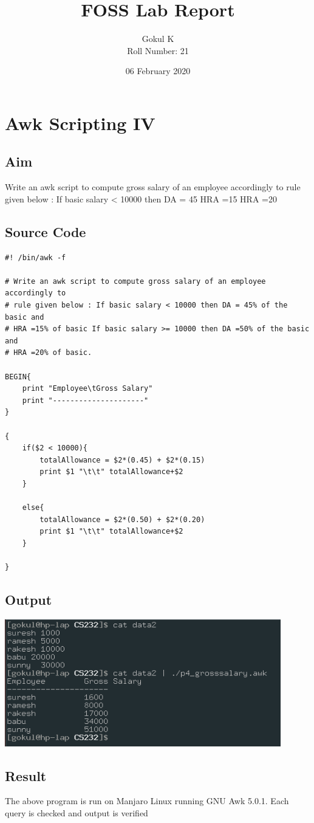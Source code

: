 \documentclass{article}
\begin{document}
\title{FOSS Lab Report}
\author{Gokul K\\[2\baselineskip]
Roll Number: 21\\[2\baselineskip]}
\date{06 February 2020}

\maketitle

\setcounter{section}{18}
\section{Awk Scripting IV}
\subsection{Aim}
Write an awk script to compute gross salary of an employee accordingly to
rule given below : If basic salary < 10000 then DA = 45%
HRA =15%
HRA =20%


\subsection{Source Code}
\begin{verbatim}
#! /bin/awk -f

# Write an awk script to compute gross salary of an employee accordingly to
# rule given below : If basic salary < 10000 then DA = 45% of the basic and 
# HRA =15% of basic If basic salary >= 10000 then DA =50% of the basic and 
# HRA =20% of basic.

BEGIN{
    print "Employee\tGross Salary"
    print "---------------------"
}

{
    if($2 < 10000){
        totalAllowance = $2*(0.45) + $2*(0.15)
        print $1 "\t\t" totalAllowance+$2
    }

    else{
        totalAllowance = $2*(0.50) + $2*(0.20)
        print $1 "\t\t" totalAllowance+$2
    }    

}
\end{verbatim}

\subsection{Output}
\includegraphics[width=0.9\textwidth]{img/p19/ss.png}\newline

\subsection{Result}
The above program is run on Manjaro Linux running GNU Awk 5.0.1. 
Each query is checked and output is verified
\end{document}
